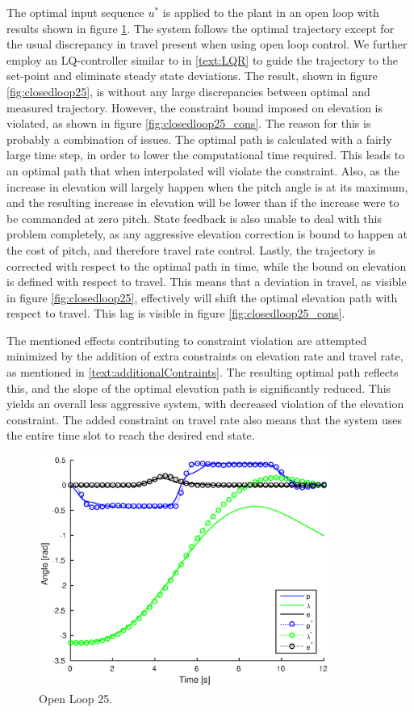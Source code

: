 The optimal input sequence $u^*$ is applied to the plant in an open loop with results shown in figure \ref{fig:openloop25}. The system follows the optimal trajectory except for the usual discrepancy in travel present when using open loop control. We further employ an LQ-controller similar to in \ref{text:LQR} to guide the trajectory to the set-point and eliminate steady state deviations. The result, shown in figure \ref{fig:closedloop25}, is without any large discrepancies between optimal and measured trajectory. However, the constraint bound imposed on elevation is violated, as shown in figure \ref{fig:closedloop25_cons}. The reason for this is probably a combination of issues. The optimal path is calculated with a fairly large time step, in order to lower the computational time required. This leads to an optimal path that when interpolated will violate the constraint. Also, as the increase in elevation will largely happen when the pitch angle is at its maximum, and the resulting increase in elevation will be lower than if the increase were to be commanded at zero pitch. State feedback is also unable to deal with this problem completely, as any aggressive elevation correction is bound to happen at the cost of pitch, and therefore travel rate control. Lastly, the trajectory is corrected with respect to the optimal path in time, while the bound on elevation is defined with respect to travel. This means that a deviation in travel, as visible in figure \ref{fig:closedloop25}, effectively will shift the optimal elevation path with respect to travel. This lag is visible in figure \ref{fig:closedloop25_cons}.

The mentioned effects contributing to constraint violation are attempted minimized by the addition of extra constraints on elevation rate and travel rate, as mentioned in \ref{text:additionalContraints}. The resulting optimal path reflects this, and the slope of the optimal elevation path is significantly reduced. This yields an overall less aggressive system, with decreased violation of the elevation constraint. The added constraint on travel rate also means that the system uses the entire time slot to reach the desired end state.

\begin{figure}[hp]
	\centering
		\includegraphics[width=0.85\textwidth]{figures/4/openloop25.eps}
	\caption{Open Loop 25.}
	\label{fig:openloop25}
\end{figure}

